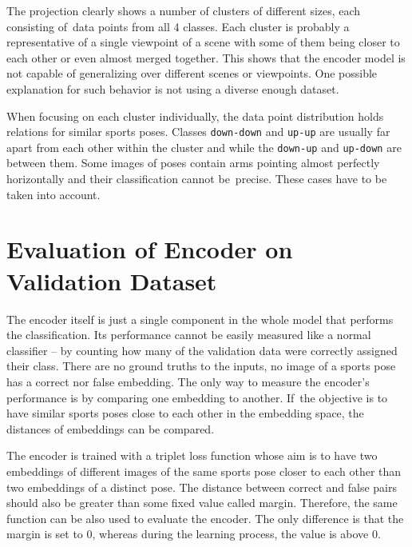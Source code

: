 The projection clearly shows a number of clusters of different sizes, each consisting of~data points from all 4 classes. Each cluster is probably a representative of a single viewpoint of a scene with some of them being closer to each other or even almost merged together. This shows that the encoder model is not capable of generalizing over different scenes or viewpoints. One possible explanation for such behavior is not using a diverse enough dataset.

When focusing on each cluster individually, the data point distribution holds relations for similar sports poses. Classes \texttt{down-down} and \texttt{up-up} are usually far apart from each other within the cluster and while the \texttt{down-up} and \texttt{up-down} are between them. Some images of poses contain arms pointing almost perfectly horizontally and their classification cannot be~precise. These cases have to be taken into account.

\section{\label{sec:evaluate-encoder}Evaluation of Encoder on Validation Dataset}

The encoder itself is just a single component in the whole model that performs the classification. Its performance cannot be easily measured like a normal classifier -- by counting how many of the validation data were correctly assigned their class. There are no ground truths to the inputs, no image of a sports pose has a correct nor false embedding. The only way to measure the encoder's performance is by comparing one embedding to another. If~the objective is to have similar sports poses close to each other in the embedding space, the distances of embeddings can be compared.

The encoder is trained with a triplet loss function whose aim is to have two embeddings of different images of the same sports pose closer to each other than two embeddings of a distinct pose. The distance between correct and false pairs should also be greater than some fixed value called margin. Therefore, the same function can be also used to evaluate the encoder. The only difference is that the margin is set to 0, whereas during the learning process, the value is above 0.

